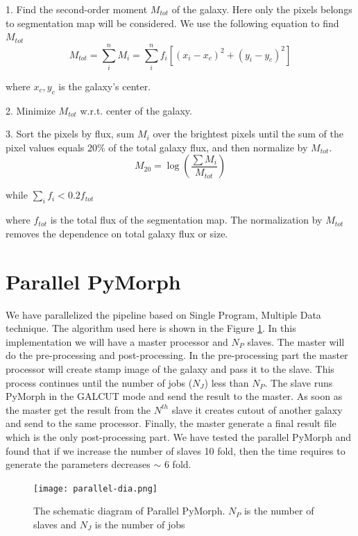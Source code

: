 \documentclass[a4paper,10pt]{article}
\begin{document}
1. Find the second-order moment $M_{tot}$ of the galaxy. Here only the pixels belongs to segmentation map will be considered. We use the following equation to find $M_{tot}$
\begin{equation}
M_{tot}=\sum_{i}^n M_i=\sum_{i}^n f_i\left[ (x_i-x_c)^2 +(y_i-y_c)^2\right]
\end{equation}

where $x_c, y_c$ is the galaxy's center.

2. Minimize $M_{tot}$ w.r.t. center of the galaxy.

3. Sort the pixels by flux, sum $M_i$ over the brightest pixels until the sum of the pixel values equals $20\%$  of the total galaxy flux, and then normalize by $M_{tot}$.
\begin{equation}
M_20 = \log\left( \frac{\sum M_i}{M_{tot}}\right)
\end{equation}

while $\sum_i f_i <0.2 f_{tot}$

where $f_{tot}$ is the total flux of the segmentation map. The normalization by $M_{tot}$ removes the dependence  on total galaxy flux or size.

\section{Parallel PyMorph}
We have parallelized the pipeline based on Single Program, Multiple Data technique. The algorithm used here is shown in the Figure \ref{fig:para}. In this implementation we will have a master processor and $N_P$ slaves. The master will do the pre-processing and post-processing. In the pre-processing part the master processor will create stamp image of the galaxy and pass it to the slave. This process continues until the number of jobs ($N_J$) less than $N_P$. The slave runs PyMorph in the GALCUT mode and send the result to the master. As soon as the master get the result from the $N^{th}$ slave it creates cutout of another galaxy and send to the same processor. Finally, the master generate a final result file which is the only post-processing part. We have tested the parallel PyMorph and found that if we increase the number of slaves 10 fold, then the time requires to generate the parameters decreases $\sim$ 6 fold.
\begin{figure}
 \centering
 \texttt{[image: parallel-dia.png]}
 \label{fig:para}
\caption{The schematic diagram of Parallel PyMorph. $N_P$ is the number of slaves and $N_J$ is the number of jobs}
\end{figure}
\end{document}
